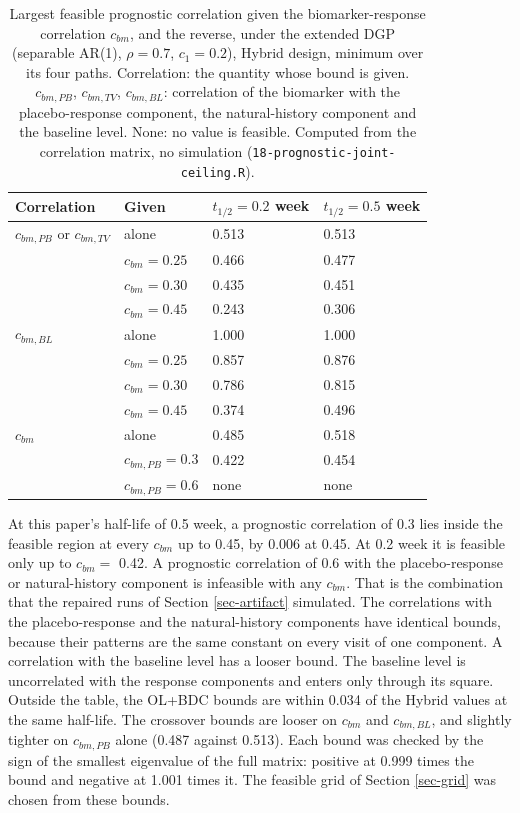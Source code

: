 \documentclass[
  11pt,
]{article}
\newcounter{none} %
\begin{document}
\begin{table}
\centering
\caption{\label{tab:tab-jointceil}Largest feasible prognostic correlation given the
      biomarker-response correlation $c_{bm}$, and the reverse, under
      the extended DGP (separable AR(1), $\rho = 0.7$, $c_1 = 0.2$),
      Hybrid design, minimum over its four paths. Correlation: the
      quantity whose bound is given. $c_{bm,PB}$, $c_{bm,TV}$,
      $c_{bm,BL}$: correlation of the biomarker with the
      placebo-response component, the natural-history component and
      the baseline level. None: no value is feasible. Computed from
      the correlation matrix, no simulation
      (\texttt{18-prognostic-joint-ceiling.R}).}
\centering
\fontsize{9}{11}\selectfont
\begin{tabular}[t]{llll}
\toprule
Correlation & Given & $t_{1/2} = 0.2$ week & $t_{1/2} = 0.5$ week\\
\midrule
$c_{bm,PB}$ or $c_{bm,TV}$ & alone & 0.513 & 0.513\\
 & $c_{bm} = 0.25$ & 0.466 & 0.477\\
 & $c_{bm} = 0.30$ & 0.435 & 0.451\\
 & $c_{bm} = 0.45$ & 0.243 & 0.306\\
$c_{bm,BL}$ & alone & 1.000 & 1.000\\
 & $c_{bm} = 0.25$ & 0.857 & 0.876\\
 & $c_{bm} = 0.30$ & 0.786 & 0.815\\
 & $c_{bm} = 0.45$ & 0.374 & 0.496\\
$c_{bm}$ & alone & 0.485 & 0.518\\
 & $c_{bm,PB} = 0.3$ & 0.422 & 0.454\\
 & $c_{bm,PB} = 0.6$ & none & none\\
\bottomrule
\end{tabular}
\end{table}

At this paper's half-life of 0.5 week, a prognostic correlation of
0.3 lies inside the feasible region at every \(c_{bm}\) up to 0.45, by
0.006 at 0.45. At 0.2 week it is feasible only up to
\(c_{bm} =\) 0.42. A prognostic correlation of 0.6 with the
placebo-response or natural-history component is infeasible with any
\(c_{bm}\). That is the combination that the repaired runs of Section
\ref{sec-artifact} simulated. The correlations with the
placebo-response and the natural-history components have identical
bounds, because their patterns are the same constant on every visit
of one component. A correlation with the baseline level has a looser
bound. The baseline level is uncorrelated with the response
components and enters only through its square. Outside the table,
the OL+BDC bounds are within 0.034 of the Hybrid
values at the same half-life. The crossover bounds are looser on
\(c_{bm}\) and \(c_{bm,BL}\), and slightly tighter on \(c_{bm,PB}\) alone
(0.487 against 0.513). Each bound was checked
by the sign of the smallest eigenvalue of the full matrix: positive
at 0.999 times the bound and negative at 1.001 times it. The feasible
grid of Section \ref{sec-grid} was chosen from these bounds.
\end{document}
